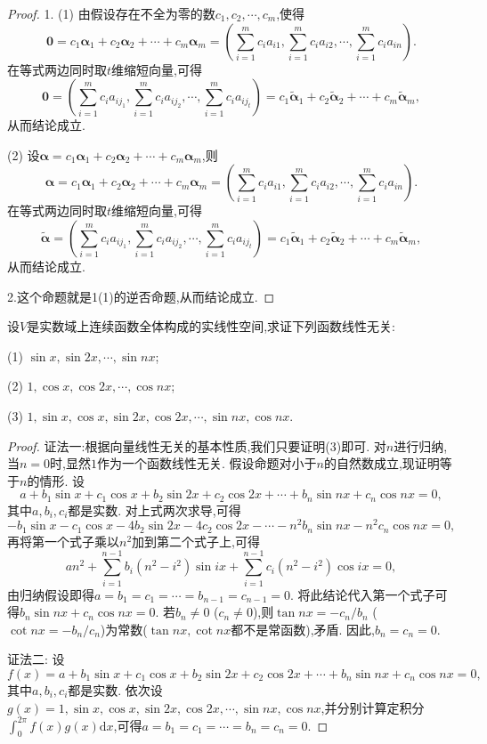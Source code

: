 \documentclass[../../main.tex]{subfiles}%
\begin{document}
\begin{proof}
1. (1) 由假设存在不全为零的数\(c_1,c_2,\cdots,c_m\),使得
\[
\boldsymbol{0}=c_1\boldsymbol{\alpha}_1 + c_2\boldsymbol{\alpha}_2+\cdots + c_m\boldsymbol{\alpha}_m=\left(\sum_{i = 1}^{m}c_ia_{i1},\sum_{i = 1}^{m}c_ia_{i2},\cdots,\sum_{i = 1}^{m}c_ia_{in}\right).
\]
在等式两边同时取\(t\)维缩短向量,可得
\[
\boldsymbol{0}=\left(\sum_{i = 1}^{m}c_ia_{ij_1},\sum_{i = 1}^{m}c_ia_{ij_2},\cdots,\sum_{i = 1}^{m}c_ia_{ij_t}\right)=c_1\widetilde{\boldsymbol{\alpha}}_1 + c_2\widetilde{\boldsymbol{\alpha}}_2+\cdots + c_m\widetilde{\boldsymbol{\alpha}}_m,
\]
从而结论成立.

(2) 设\(\boldsymbol{\alpha}=c_1\boldsymbol{\alpha}_1 + c_2\boldsymbol{\alpha}_2+\cdots + c_m\boldsymbol{\alpha}_m\),则
\[
\boldsymbol{\alpha}=c_1\boldsymbol{\alpha}_1 + c_2\boldsymbol{\alpha}_2+\cdots + c_m\boldsymbol{\alpha}_m=\left(\sum_{i = 1}^{m}c_ia_{i1},\sum_{i = 1}^{m}c_ia_{i2},\cdots,\sum_{i = 1}^{m}c_ia_{in}\right).
\]
在等式两边同时取\(t\)维缩短向量,可得
\[
\widetilde{\boldsymbol{\alpha}}=\left(\sum_{i = 1}^{m}c_ia_{ij_1},\sum_{i = 1}^{m}c_ia_{ij_2},\cdots,\sum_{i = 1}^{m}c_ia_{ij_t}\right)=c_1\widetilde{\boldsymbol{\alpha}}_1 + c_2\widetilde{\boldsymbol{\alpha}}_2+\cdots + c_m\widetilde{\boldsymbol{\alpha}}_m,
\]
从而结论成立. 

2.这个命题就是1(1)的逆否命题,从而结论成立.
\end{proof}

\begin{example}\label{example:3.1.1.1}
设\(V\)是实数域上连续函数全体构成的实线性空间,求证下列函数线性无关:

(1) \(\sin x,\sin 2x,\cdots,\sin nx\);

(2) \(1,\cos x,\cos 2x,\cdots,\cos nx\);

(3) \(1,\sin x,\cos x,\sin 2x,\cos 2x,\cdots,\sin nx,\cos nx\).
\end{example}
\begin{proof}

{\color{blue}证法一:}根据向量线性无关的基本性质,我们只要证明(3)即可. 对\(n\)进行归纳,当\(n = 0\)时,显然\(1\)作为一个函数线性无关. 假设命题对小于\(n\)的自然数成立,现证明等于\(n\)的情形. 设
\[
a + b_1\sin x + c_1\cos x + b_2\sin 2x + c_2\cos 2x+\cdots + b_n\sin nx + c_n\cos nx = 0,
\]
其中\(a,b_i,c_i\)都是实数. 对上式两次求导,可得
\[
-b_1\sin x - c_1\cos x - 4b_2\sin 2x - 4c_2\cos 2x-\cdots - n^2b_n\sin nx - n^2c_n\cos nx = 0,
\]
再将第一个式子乘以\(n^2\)加到第二个式子上,可得
\[
an^2+\sum_{i = 1}^{n - 1}b_i(n^2 - i^2)\sin ix+\sum_{i = 1}^{n - 1}c_i(n^2 - i^2)\cos ix = 0,
\]
由归纳假设即得\(a = b_1 = c_1=\cdots = b_{n - 1} = c_{n - 1} = 0\). 将此结论代入第一个式子可得\(b_n\sin nx + c_n\cos nx = 0\). 若\(b_n\neq0\) (\(c_n\neq0\)),则\(\tan nx=-c_n/b_n\) (\(\cot nx=-b_n/c_n\))为常数($\tan nx,\cot nx$都不是常函数),矛盾. 因此,\(b_n = c_n = 0\).

{\color{blue}证法二:} 设
\[
f(x)=a + b_1\sin x + c_1\cos x + b_2\sin 2x + c_2\cos 2x+\cdots + b_n\sin nx + c_n\cos nx = 0,
\]
其中\(a,b_i,c_i\)都是实数. 依次设\(g(x)=1,\sin x,\cos x,\sin 2x,\cos 2x,\cdots,\sin nx,\cos nx\),并分别计算定积分\(\int_{0}^{2\pi}f(x)g(x)\mathrm{d}x\),可得\(a = b_1 = c_1=\cdots = b_n = c_n = 0\). 
\end{proof}
\end{document}
